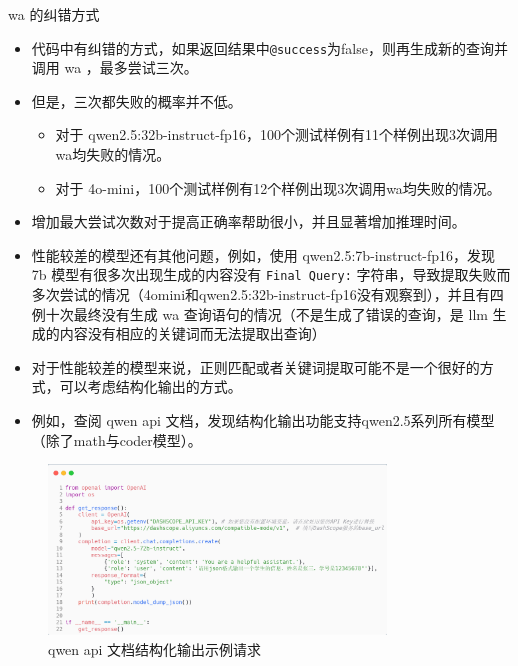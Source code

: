\begin{frame}{wa 的纠错方式}
	\begin{itemize}
		\item   代码中有纠错的方式，如果返回结果中\texttt{@success}为false，则再生成新的查询并调用 wa ，最多尝试三次。
		      \pause
		\item 但是，三次都失败的概率并不低。
		      \begin{itemize}
			      \item 对于 qwen2.5:32b-instruct-fp16，100个测试样例有11个样例出现3次调用wa均失败的情况。
			      \item 对于 4o-mini，100个测试样例有12个样例出现3次调用wa均失败的情况。
		      \end{itemize}
		      \pause
		\item 增加最大尝试次数对于提高正确率帮助很小，并且显著增加推理时间。
		      \pause
		\item 性能较差的模型还有其他问题，例如，使用 qwen2.5:7b-instruct-fp16，发现 7b 模型有很多次出现生成的内容没有 \texttt{Final Query:} 字符串，导致提取失败而多次尝试的情况（4omini和qwen2.5:32b-instruct-fp16没有观察到），并且有四例十次最终没有生成 wa 查询语句的情况（不是生成了错误的查询，是 llm 生成的内容没有相应的关键词而无法提取出查询）
	\end{itemize}
	
	
	
\end{frame}
\begin{frame}
	\begin{itemize}
		\item 对于性能较差的模型来说，正则匹配或者关键词提取可能不是一个很好的方式，可以考虑结构化输出的方式。
		\pause
		\bigskip
		\item 例如，查阅 qwen api 文档，发现结构化输出功能支持qwen2.5系列所有模型（除了math与coder模型）。
	\end{itemize}
	
	
\end{frame}
\begin{frame}
	\begin{figure}
		\includegraphics[width=0.8\textwidth]{./pic/3.png}
		\caption{qwen api 文档结构化输出示例请求}
	\end{figure}
\end{frame}

